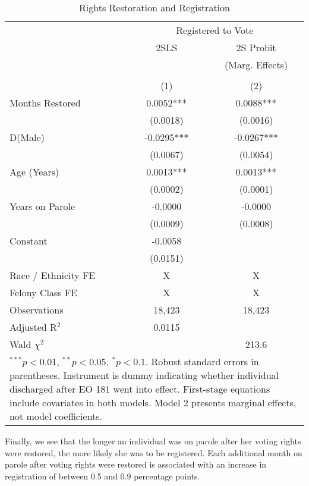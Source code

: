 \documentclass[
  12pt,
]{article}
\begin{document}
\begin{singlespace}
\begin{table}[H]
\caption{\label{tab:iv-models-chunk-time}\label{tab:iv-models-time} Rights Restoration and Registration}
\fontsize{10}{12}\selectfont
\centering

\begin{tabular}{lcc}
\\[-1.8ex]\hline
& \multicolumn{2}{c}{Registered to Vote} \\
& \multicolumn{1}{c}{2SLS} & \multicolumn{1}{c}{2S Probit}\\
& &  \multicolumn{1}{c}{(Marg. Effects)}\\
\cmidrule(l{3pt}r{3pt}){2-2} \cmidrule(l{3pt}r{3pt}){3-3}
\\[-1.8ex] & (1) & (2) \\
\hline
Months Restored & 0.0052*** & 0.0088*** \\
 & (0.0018) & (0.0016) \\
D(Male) & -0.0295*** & -0.0267*** \\
 & (0.0067) & (0.0054) \\
Age (Years) & 0.0013*** & 0.0013*** \\
 & (0.0002) & (0.0001) \\
Years on Parole & -0.0000 & -0.0000 \\
 & (0.0009) & (0.0008) \\
Constant & -0.0058 &  \\
 & (0.0151) &  \\
\hline
Race / Ethnicity FE & X & X \\
Felony Class FE & X & X \\
\hline
Observations & 18,423 & 18,423 \\
Adjusted R$^2$ & 0.0115 &  \\
 Wald $\chi^2$ &  & 213.6 \\
\hline
\multicolumn{3}{l}{\scriptsize{\parbox{.5\linewidth}{\vspace{2pt}$^{***}p<0.01$, $^{**}p<0.05$, $^*p<0.1$. \\
Robust standard errors in parentheses. \\
Instrument is dummy indicating whether \\
individual discharged after EO 181 went into effect. \\
First-stage equations include covariates in both models. \\
Model 2 presents marginal effects, not model coefficients.}}}
\end{tabular}
\end{table}

\end{singlespace}

Finally, we see that the longer an individual was on parole after her voting rights were restored, the more likely she was to be registered. Each additional month on parole after voting rights were restored is associated with an increase in registration of between 0.5 and 0.9 percentage points.
\end{document}
